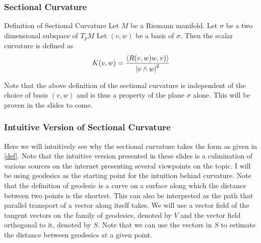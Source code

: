 
\begin{frame}
\frametitle{Sectional Curvature}
\begin{block}{Definition of Sectional Curvature}
Let $M$ be a Riemann manifold. Let $\sigma$ be a two dimensional subspace of $T_pM$ Let $(v,w)$ be a basis of $\sigma$. Then the scalar curvature is defined as
\begin{align}
\label{def}
K(v,w)=\frac{\displaystyle \left\langle R(v,w)w,v) \right\rangle}{\displaystyle \left\lvert v\wedge w \right\rvert^2}
\end{align}
\end{block}
\pause
Note that the above definition of the sectional curvature is independent of the choice of basis $(v,w)$ and is thus a property of the plane $\sigma$ alone. This will be proven in the slides to come.
\end{frame}

\begin{frame}
\frametitle{Intuitive Version of Sectional Curvature}
Here we will intuitively see why the sectional curvature takes the form as given in \ref{def}. Note that the intuitive version presented in these slides is a culmination of various sources on the internet presenting several viewpoints on the topic.
\pause
I will be using geodesics as the starting point for the intuition behind curvature. Note that the definition of geodesic is a curve on a surface along which the distance between two points is the shortest. This can also be interpreted as the path that parallel transport of a vector along itself takes.
\pause
We will use a vector field of the tangent vectors on the family of geodesics, denoted by $V$ and the vector field orthogonal to it, denoted by $S$. Note that we can use the vectors in $S$ to estimate the distance between geodesics at a given point.
\end{frame}

